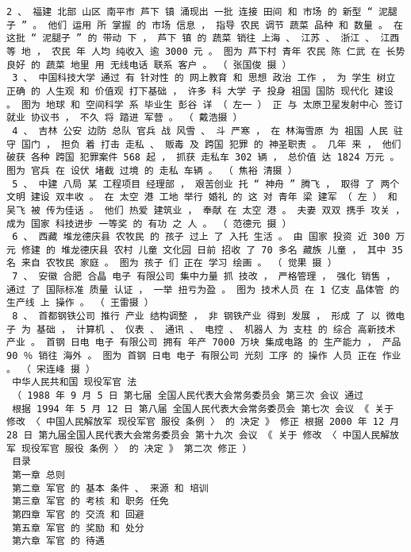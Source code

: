 \documentclass{article}
\begin{document}
\begin{Verbatim}[commandchars=\\\{\}]
 2 、 福建 北部 山区 南平市 芦下 镇 涌现出 一批 连接 田间 和 市场 的 新型 “ 泥腿子 ” 。 他们 运用 所 掌握 的 市场 信息 ， 指导 农民 调节 蔬菜 品种 和 数量 。 在 这批 “ 泥腿子 ” 的 带动 下 ， 芦下 镇 的 蔬菜 销往 上海 、 江苏 、 浙江 、 江西 等 地 ， 农民 年 人均 纯收入 逾 3000 元 。 图为 芦下村 青年 农民 陈 仁武 在 长势 良好 的 蔬菜 地里 用 无线电话 联系 客户 。 （ 张国俊 摄 ） 
 3 、 中国科技大学 通过 有 针对性 的 网上教育 和 思想 政治 工作 ， 为 学生 树立 正确 的 人生观 和 价值观 打下基础 ， 许多 科 大学 子 投身 祖国 国防 现代化 建设 。 图为 地球 和 空间科学 系 毕业生 彭谷 详 （ 左一 ） 正 与 太原卫星发射中心 签订 就业 协议书 ， 不久 将 踏进 军营 。 （ 戴浩摄 ） 
 4 、 吉林 公安 边防 总队 官兵 战 风雪 、 斗 严寒 ， 在 林海雪原 为 祖国 人民 驻守 国门 ， 担负 着 打击 走私 、 贩毒 及 跨国 犯罪 的 神圣职责 。 几年 来 ， 他们 破获 各种 跨国 犯罪案件 568 起 ， 抓获 走私车 302 辆 ， 总价值 达 1824 万元 。 图为 官兵 在 设伏 堵截 过境 的 走私 车辆 。 （ 焦裕 清摄 ） 
 5 、 中建 八局 某 工程项目 经理部 ， 艰苦创业 托 “ 神舟 ” 腾飞 ， 取得 了 两个 文明 建设 双丰收 。 在 太空 港 工地 举行 婚礼 的 这 对 青年 梁 建军 （ 左 ） 和 吴飞 被 传为佳话 。 他们 热爱 建筑业 ， 奉献 在 太空 港 。 夫妻 双双 携手 攻关 ， 成为 国家 科技进步 一等奖 的 有功 之 人 。 （ 范德元 摄 ） 
 6 、 西藏 堆龙德庆县 农牧民 的 孩子 过上 了 入托 生活 。 由 国家 投资 近 300 万元 修建 的 堆龙德庆县 农村 儿童 文化园 日前 招收 了 70 多名 藏族 儿童 ， 其中 35 名 来自 农牧民 家庭 。 图为 孩子 们 正在 学习 绘画 。 （ 觉果 摄 ） 
 7 、 安徽 合肥 合晶 电子 有限公司 集中力量 抓 技改 ， 严格管理 ， 强化 销售 ， 通过 了 国际标准 质量 认证 ， 一举 扭亏为盈 。 图为 技术人员 在 1 亿支 晶体管 的 生产线 上 操作 。 （ 王雷摄 ） 
 8 、 首都钢铁公司 推行 产业 结构调整 ， 非 钢铁产业 得到 发展 ， 形成 了 以 微电子 为 基础 ， 计算机 、 仪表 、 通讯 、 电控 、 机器人 为 支柱 的 综合 高新技术 产业 。 首钢 日电 电子 有限公司 拥有 年产 7000 万块 集成电路 的 生产能力 ， 产品 90 ％ 销往 海外 。 图为 首钢 日电 电子 有限公司 光刻 工序 的 操作 人员 正在 作业 。 （ 宋连峰 摄 ） 
 中华人民共和国 现役军官 法 
 （ 1988 年 9 月 5 日 第七届 全国人民代表大会常务委员会 第三次 会议 通过 
 根据 1994 年 5 月 12 日 第八届 全国人民代表大会常务委员会 第七次 会议 《 关于 修改 〈 中国人民解放军 现役军官 服役 条例 〉 的 决定 》 修正 根据 2000 年 12 月 28 日 第九届全国人民代表大会常务委员会 第十九次 会议 《 关于 修改 〈 中国人民解放军 现役军官 服役 条例 〉 的 决定 》 第二次 修正 ） 
 目录 
 第一章 总则 
 第二章 军官 的 基本 条件 、 来源 和 培训 
 第三章 军官 的 考核 和 职务 任免 
 第四章 军官 的 交流 和 回避 
 第五章 军官 的 奖励 和 处分 
 第六章 军官 的 待遇 

\end{Verbatim}
\end{document}
